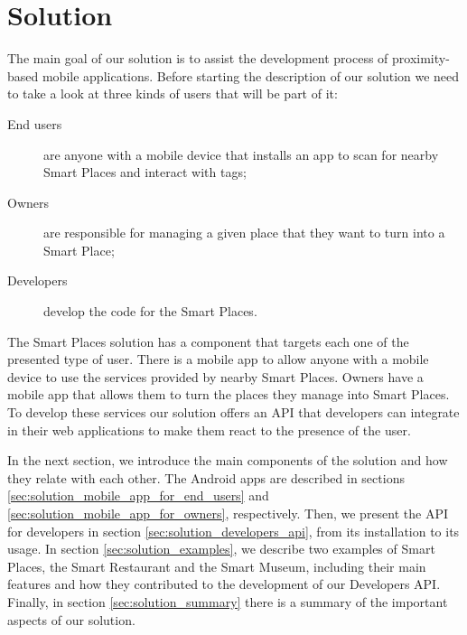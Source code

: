 
\chapter{Solution}
\label{chapter:solution}
The main goal of our solution is to assist
the development process of proximity-based mobile applications.
Before starting the description of our solution we need to take a look at three kinds of users that will be part of it:
\begin{description}
  \item[End users] are anyone with a mobile device that installs an app to scan for nearby Smart Places and interact with tags;
  \item[Owners] are responsible for managing a given place that they want to turn into a Smart Place;
  \item[Developers] develop the code for the Smart Places.
\end{description}

The Smart Places solution has a component that targets each one of the presented type of user.
There is a mobile app to allow anyone with a mobile device to use the services provided by nearby Smart Places.
Owners have a mobile app that allows them to turn the places they manage into Smart Places.
To develop these services our solution offers an \gls{API} that developers can integrate in their web applications to make them react to the presence of the user.

In the next section, we introduce the main components of the solution and how they relate with each other.
The Android apps are described in sections \ref{sec:solution_mobile_app_for_end_users} and \ref{sec:solution_mobile_app_for_owners}, respectively.
Then, we present the \gls{API} for developers in section \ref{sec:solution_developers_api}, from its installation to its usage.
In section \ref{sec:solution_examples}, we describe two examples of Smart Places, the Smart Restaurant and the Smart Museum, including their main features and how they contributed to the development of our Developers \gls{API}.
Finally, in section \ref{sec:solution_summary} there is a summary of the important aspects of our solution.


